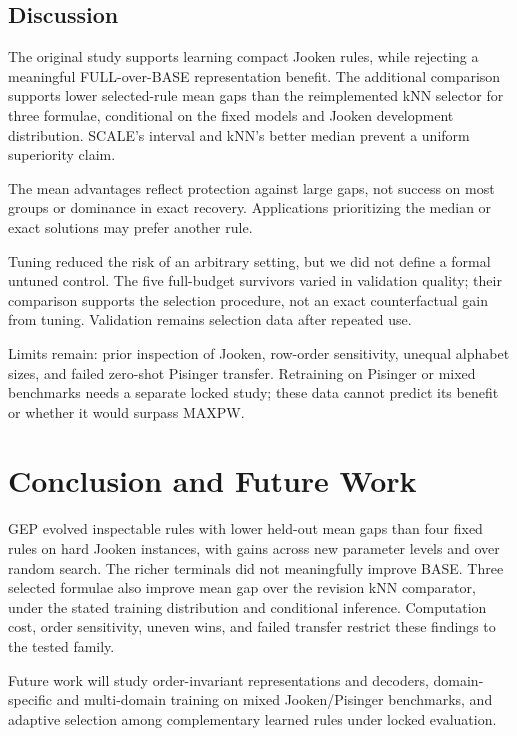 \documentclass[conference]{IEEEtran}
\begin{document}
\subsection{Discussion}
\label{sec:Discussion}

The original study supports learning compact Jooken rules, while rejecting a meaningful FULL-over-BASE representation benefit. The additional comparison supports lower selected-rule mean gaps than the reimplemented kNN selector for three formulae, conditional on the fixed models and Jooken development distribution. SCALE's interval and kNN's better median prevent a uniform superiority claim.

The mean advantages reflect protection against large gaps, not success on most groups or dominance in exact recovery. Applications prioritizing the median or exact solutions may prefer another rule.

Tuning reduced the risk of an arbitrary setting, but we did not define a formal untuned control. The five full-budget survivors varied in validation quality; their comparison supports the selection procedure, not an exact counterfactual gain from tuning. Validation remains selection data after repeated use.

Limits remain: prior inspection of Jooken, row-order sensitivity, unequal alphabet sizes, and failed zero-shot Pisinger transfer. Retraining on Pisinger or mixed benchmarks needs a separate locked study; these data cannot predict its benefit or whether it would surpass MAXPW.

\section{Conclusion and Future Work}
\label{sec:Conclusion}

GEP evolved inspectable rules with lower held-out mean gaps than four fixed rules on hard Jooken instances, with gains across new parameter levels and over random search. The richer terminals did not meaningfully improve BASE. Three selected formulae also improve mean gap over the revision kNN comparator, under the stated training distribution and conditional inference. Computation cost, order sensitivity, uneven wins, and failed transfer restrict these findings to the tested family.

Future work will study order-invariant representations and decoders, domain-specific and multi-domain training on mixed Jooken/Pisinger benchmarks, and adaptive selection among complementary learned rules under locked evaluation.
\end{document}
